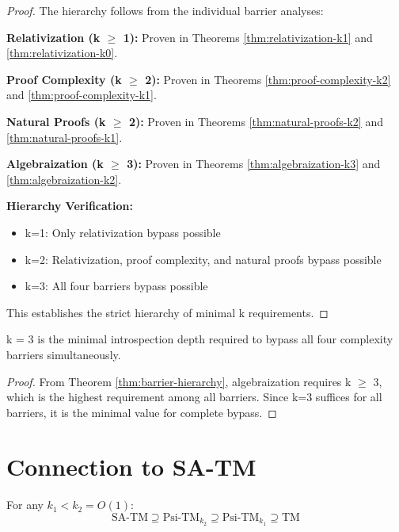 \documentclass[11pt]{article}
\begin{document}
\begin{proof}
The hierarchy follows from the individual barrier analyses:

\textbf{Relativization (k $\geq$ 1):} Proven in Theorems \ref{thm:relativization-k1} and \ref{thm:relativization-k0}.

\textbf{Proof Complexity (k $\geq$ 2):} Proven in Theorems \ref{thm:proof-complexity-k2} and \ref{thm:proof-complexity-k1}.

\textbf{Natural Proofs (k $\geq$ 2):} Proven in Theorems \ref{thm:natural-proofs-k2} and \ref{thm:natural-proofs-k1}.

\textbf{Algebraization (k $\geq$ 3):} Proven in Theorems \ref{thm:algebraization-k3} and \ref{thm:algebraization-k2}.

\textbf{Hierarchy Verification:}
\begin{itemize}
\item k=1: Only relativization bypass possible
\item k=2: Relativization, proof complexity, and natural proofs bypass possible
\item k=3: All four barriers bypass possible
\end{itemize}

This establishes the strict hierarchy of minimal k requirements.
\end{proof}

\begin{corollary}
\label{cor:optimal-k}
k = 3 is the minimal introspection depth required to bypass all four complexity barriers simultaneously.
\end{corollary}

\begin{proof}
From Theorem \ref{thm:barrier-hierarchy}, algebraization requires k $\geq$ 3, which is the highest requirement among all barriers. Since k=3 suffices for all barriers, it is the minimal value for complete bypass.
\end{proof}

\section{Connection to SA-TM}

\begin{theorem}
For any $k_1 < k_2 = O(1)$:
$$\text{SA-TM} \supseteq \text{Psi-TM}_{k_2} \supseteq \text{Psi-TM}_{k_1} \supseteq \text{TM}$$
\end{theorem}
\end{document}
